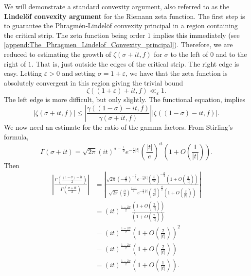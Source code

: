 \documentclass[12pt]{book}
\theoremstyle{definition}\newframedtheorem{method}{Method}
\newcommand{\g}{\gamma}
\newcommand{\z}{\zeta}
\newcommand{\s}{\sigma}
\newcommand{\G}{\Gamma}
\newcommand{\e}{\varepsilon}
\newcommand{\<}{\langle}
\renewcommand{\>}{\rangle}
\begin{document}
    We will demonstrate a standard convexity argument, also referred to as the \textbf{Lindel\"of convexity argument} for the Riemann zeta function. The first step is to guarantee the Phragm\'en-Lindel\"of convexity principal in a region containing the critical strip. The zeta function being order $1$ implies this immediately (see \cref{append:The_Phragmen_Lindelof_Convexity_principal}). Therefore, we are reduced to estimating the growth of $\z(\s+it,f)$ for $\s$ to the left of $0$ and to the right of $1$. That is, just outside the edges of the critical strip. The right edge is easy. Letting $\e > 0$ and setting $\s = 1+\e$, we have that the zeta function is absolutely convergent in this region giving the trivial bound
    \begin{equation}\label{equ:convexity_bound_1}
      \z((1+\e)+it,f) \ll_{\e} 1.
    \end{equation}
    The left edge is more difficult, but only slightly. The functional equation, implies
    \begin{equation}\label{equ:convexity_bound_left_edge}
      |\z(\s+it,f)| \le \left|\frac{\g((1-\s)-it,f)}{\g(\s+it,f)}\right||\z((1-\s)-it,f)|.
    \end{equation}
    We now need an estimate for the ratio of the gamma factors. From Stirling's formula,
    \[
      \G(\s+it) = \sqrt{2\pi}(it)^{\s-\frac{1}{2}}e^{-\frac{\pi}{2}|t|}\left(\frac{|t|}{e}\right)^{it}\left(1+O\left(\frac{1}{|t|}\right)\right).
    \]
    Then
    \begin{align*}
      \left|\frac{\G\left(\frac{(1-\s)-it}{2}\right)}{\G\left(\frac{\s+it}{2}\right)}\right| &= \left|\frac{\sqrt{2\pi}\left(-\frac{it}{2}\right)^{-\frac{\s}{2}}e^{-\frac{\pi}{4}|t|}\left(\frac{|t|}{2e}\right)^{-\frac{it}{2}}\left(1+O\left(\frac{2}{|t|}\right)\right)}{\sqrt{2\pi}\left(\frac{it}{2}\right)^{\frac{\s-1}{2}}e^{-\frac{\pi}{4}|t|}\left(\frac{|t|}{2e}\right)^{\frac{it}{2}}\left(1+O\left(\frac{2}{|t|}\right)\right)}\right| \\
      &= (it)^{\frac{1-2\s}{2}}\frac{\left(1+O\left(\frac{2}{|t|}\right)\right)}{\left(1+O\left(\frac{2}{|t|}\right)\right)} \\
      &= (it)^{\frac{1-2\s}{2}}\left(1+O\left(\frac{2}{|t|}\right)\right)^{2} \\
      &= (it)^{\frac{1-2\s}{2}}\left(1+O\left(\frac{2}{|t|}\right)\right) \\
      &= (it)^{\frac{1-2\s}{2}}\left(1+O\left(\frac{1}{|t|}\right)\right).
    \end{align*}
\end{document}
